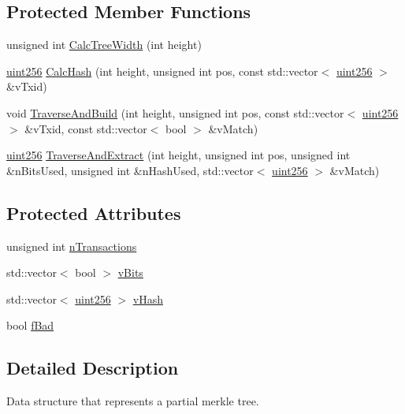 \subsection*{Protected Member Functions}
\begin{DoxyCompactItemize}
\item 
unsigned int \mbox{\hyperlink{class_c_partial_merkle_tree_a7dd0288d62321fb5aa2c27a3372ee8fe}{Calc\+Tree\+Width}} (int height)
\item 
\mbox{\hyperlink{classuint256}{uint256}} \mbox{\hyperlink{class_c_partial_merkle_tree_a69e7771f95c498f6a340dcc227abcde4}{Calc\+Hash}} (int height, unsigned int pos, const std\+::vector$<$ \mbox{\hyperlink{classuint256}{uint256}} $>$ \&v\+Txid)
\item 
void \mbox{\hyperlink{class_c_partial_merkle_tree_a62bdcaf5b5ee6c6327ef67fb027a5fef}{Traverse\+And\+Build}} (int height, unsigned int pos, const std\+::vector$<$ \mbox{\hyperlink{classuint256}{uint256}} $>$ \&v\+Txid, const std\+::vector$<$ bool $>$ \&v\+Match)
\item 
\mbox{\hyperlink{classuint256}{uint256}} \mbox{\hyperlink{class_c_partial_merkle_tree_a3ddbe75a92d93059c30f6e60bacc7054}{Traverse\+And\+Extract}} (int height, unsigned int pos, unsigned int \&n\+Bits\+Used, unsigned int \&n\+Hash\+Used, std\+::vector$<$ \mbox{\hyperlink{classuint256}{uint256}} $>$ \&v\+Match)
\end{DoxyCompactItemize}
\subsection*{Protected Attributes}
\begin{DoxyCompactItemize}
\item 
unsigned int \mbox{\hyperlink{class_c_partial_merkle_tree_a0d3bd530f19f2c75c140a05c6f99782a}{n\+Transactions}}
\item 
std\+::vector$<$ bool $>$ \mbox{\hyperlink{class_c_partial_merkle_tree_a22a522d1fb8d449f4c91b65283339e7d}{v\+Bits}}
\item 
std\+::vector$<$ \mbox{\hyperlink{classuint256}{uint256}} $>$ \mbox{\hyperlink{class_c_partial_merkle_tree_a863cf9024be1b8fa97db08dfd6dbd687}{v\+Hash}}
\item 
bool \mbox{\hyperlink{class_c_partial_merkle_tree_a24bb0d9d17d6001dcfbca4d550c64ba3}{f\+Bad}}
\end{DoxyCompactItemize}


\subsection{Detailed Description}
Data structure that represents a partial merkle tree.

